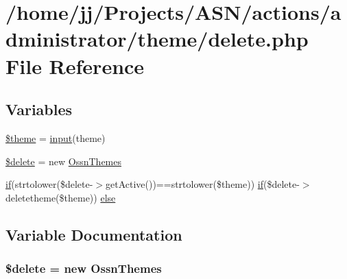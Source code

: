 \hypertarget{actions_2administrator_2theme_2delete_8php}{}\section{/home/jj/\+Projects/\+A\+S\+N/actions/administrator/theme/delete.php File Reference}
\label{actions_2administrator_2theme_2delete_8php}
\subsection*{Variables}
\begin{DoxyCompactItemize}
\item 
\hyperlink{actions_2administrator_2theme_2delete_8php_a1ae541f7fe1c5e21cb4535f88ec9e9dc}{\$theme} = \hyperlink{ossn_8lib_8input_8php_a64ebee98b041c4f75f71ed3cd73cc8ed}{input}(\textquotesingle{}theme\textquotesingle{})
\item 
\hyperlink{actions_2administrator_2theme_2delete_8php_aba2374a8b713514611e21494ec2fef8d}{\$delete} = new \hyperlink{class_ossn_themes}{Ossn\+Themes}
\item 
\hyperlink{jquery_8tokeninput_8js_ad8dd46a3cbc004569e34401e9e71771a}{if}(strtolower(\$delete-\/$>$get\+Active())==strtolower(\$theme)) \hyperlink{jquery_8tokeninput_8js_ad8dd46a3cbc004569e34401e9e71771a}{if}(\$delete-\/$>$deletetheme(\$theme)) \hyperlink{actions_2administrator_2theme_2delete_8php_ab47f7dfb658deaebf366c25c9b36e8c7}{else}
\end{DoxyCompactItemize}


\subsection{Variable Documentation}
\subsubsection[{\texorpdfstring{\$delete}{$delete}}]{\setlength{\rightskip}{0pt plus 5cm}\$delete = new {\bf Ossn\+Themes}}\hypertarget{actions_2administrator_2theme_2delete_8php_aba2374a8b713514611e21494ec2fef8d}{}\label{actions_2administrator_2theme_2delete_8php_aba2374a8b713514611e21494ec2fef8d}


